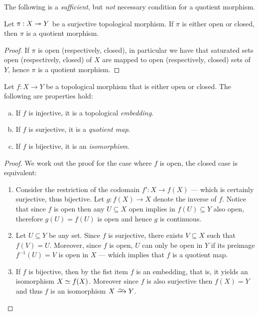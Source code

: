 The following is a \emph{sufficient}, but \emph{not} necessary condition for a
quotient morphism.

\begin{proposition}
Let \(\pi: X \twoheadrightarrow Y\) be a surjective topological morphism. If \(\pi\) is either
open or closed, then \(\pi\) is a quotient morphism.
\end{proposition}

\begin{proof}
If \(\pi\) is open (respectively, closed), in particular we have that saturated
sets open (respectively, closed) of \(X\) are mapped to open (respectively,
closed) sets of \(Y\), hence \(\pi\) is a quotient morphism.
\end{proof}


\begin{proposition}
\label{prop:map-open-or-closed-properties}
Let \(f: X \to Y\) be a topological morphism that is either open or closed. The
following are properties hold:
\begin{enumerate}[(a)]\setlength\itemsep{0em}
\item If \(f\) is injective, it is a topological \emph{embedding}.

\item If \(f\) is surjective, it is a \emph{quotient map}.

\item If \(f\) is bijective, it is an \emph{isomorphism}.
\end{enumerate}
\end{proposition}

\begin{proof}
We work out the proof for the case where \(f\) is open, the closed case is
equivalent:
\begin{enumerate}\setlength\itemsep{0em}
\item Consider the restriction of the codomain \(f': X \to f(X)\) --- which is
  certainly surjective, thus bijective. Let \(g: f(X) \to X\) denote the inverse
  of \(f\). Notice that since \(f\) is open then any \(U \subseteq X\) open
  implies in \(f(U) \subseteq Y\) also open, therefore \(g(U) = f(U)\) is open
  and hence \(g\) is continuous.

\item Let \(U \subseteq Y\) be any set. Since \(f\) is surjective, there exists
  \(V \subseteq X\) such that \(f(V) = U\). Moreover, since \(f\) is open, \(U\)
  can only be open in \(Y\) if its preimage \(f^{-1}(U) = V\) is open in \(X\)
  --- which implies that \(f\) is a quotient map.

\item If \(f\) is bijective, then by the fist item \(f\) is an embedding, that
  is, it yields an isomorphism \(X \simeq f(X)\). Moreover since \(f\) is also
  surjective then \(f(X) = Y\) and thus \(f\) is an isomorphism \(X \isoto Y\).
\end{enumerate}
\end{proof}

